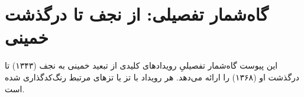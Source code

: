 
\appendix
\renewcommand{\chaptername}{پیوست}

\chapter{گاه‌شمار تفصیلی: از نجف تا درگذشت خمینی}
\label{app:timeline}

\begin{infoBox}
این پیوست گاه‌شمار تفصیلیِ رویدادهای کلیدی
از تبعید خمینی به نجف (۱۳۴۳) تا درگذشت او (۱۳۶۸)
را ارائه می‌دهد.
هر رویداد با تز یا تزهای مرتبط رنگ‌کدگذاری شده است.
\end{infoBox}


